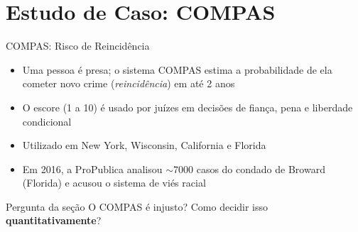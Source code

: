 \documentclass[aspectratio=169,xcolor=dvipsnames]{beamer}
\begin{document}
  \section{Estudo de Caso: COMPAS}

  \begin{frame}{COMPAS: Risco de Reincidência}
    \begin{itemize}\setlength{\itemsep}{0.3em}
      \item Uma pessoa é presa; o sistema COMPAS estima a probabilidade de ela cometer novo crime (\textit{reincidência}) em até 2 anos
      \item O escore (1 a 10) é usado por juízes em decisões de fiança, pena e liberdade condicional
      \item Utilizado em New York, Wisconsin, California e Florida
      \item Em 2016, a ProPublica analisou $\sim$7000 casos do condado de Broward (Florida) e acusou o sistema de viés racial
    \end{itemize}

    \vspace{0.3em}
    \begin{alertblock}{Pergunta da seção}
      O COMPAS é injusto? Como decidir isso \textbf{quantitativamente}?
    \end{alertblock}
  \end{frame}
\end{document}

